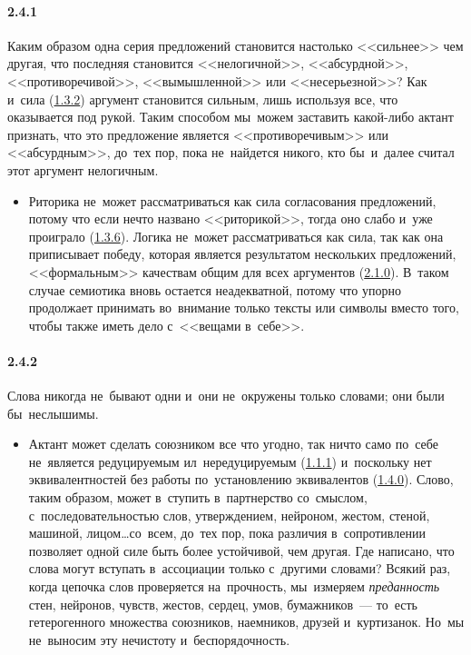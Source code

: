 \paragraph{2.4.1}\hypertarget{par:2.4.1}{} Каким образом одна серия предложений становится настолько <<сильнее>> чем другая, что последняя становится <<нелогичной>>, <<абсурдной>>, <<противоречивой>>, <<вымышленной>> или <<несерьезной>>? Как и~сила (\hyperlink{par:1.3.2}{1.3.2}) аргумент становится сильным, лишь используя все, что оказывается под рукой. Таким способом мы~можем заставить какой-либо актант признать, что это предложение является <<противоречивым>> или <<абсурдным>>, до~тех пор, пока не~найдется никого, кто бы~и~далее считал этот аргумент нелогичным.
	\begin{itemize}
	\item 
	Риторика не~может рассматриваться как сила согласования предложений, потому что если нечто названо <<риторикой>>, тогда оно слабо и~уже проиграло (\hyperlink{par:1.3.6}{1.3.6}). Логика не~может рассматриваться как сила, так как она приписывает победу, которая является результатом нескольких предложений, <<формальным>> качествам общим для всех аргументов (\hyperlink{par:2.1.0}{2.1.0}). В~таком случае семиотика вновь остается неадекватной, потому что упорно продолжает принимать во~внимание только тексты или символы вместо того, чтобы также иметь дело с~<<вещами в~себе>>.
	\end{itemize}

\paragraph{2.4.2}\hypertarget{par:2.4.2}{} Слова никогда не~бывают одни и~они не~окружены только словами; они были бы~неслышимы.
	\begin{itemize}
	\item 
	Актант может сделать союзником все что угодно, так ничто само по~себе не~является редуцируемым ил~нередуцируемым (\hyperlink{par:1.1.1}{1.1.1}) и~поскольку нет эквивалентностей без работы по~установлению эквивалентов (\hyperlink{par:1.4.0}{1.4.0}). Слово, таким образом, может в~ступить в~партнерство со~смыслом, с~последовательностью слов, утверждением, нейроном, жестом, стеной, машиной, лицом\ldots со~всем, до~тех пор, пока различия в~сопротивлении позволяет одной силе быть более устойчивой, чем другая. Где написано, что слова могут вступать в~ассоциации только с~другими словами? Всякий раз, когда цепочка слов проверяется на~прочность, мы~измеряем {\itshape преданность} стен, нейронов, чувств, жестов, сердец, умов, бумажников~--- то~есть гетерогенного множества союзников, наемников, друзей и~куртизанок. Но~мы не~выносим эту нечистоту и~беспорядочность.
	\end{itemize}

